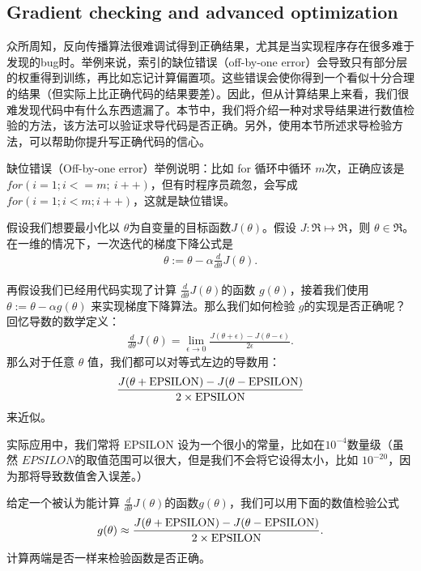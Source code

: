 \subsection{Gradient checking and advanced optimization}
众所周知，反向传播算法很难调试得到正确结果，尤其是当实现程序存在很多难于发现的bug时。举例来说，索引的缺位错误（off-by-one error）会导致只有部分层的权重得到训练，再比如忘记计算偏置项。这些错误会使你得到一个看似十分合理的结果（但实际上比正确代码的结果要差）。因此，但从计算结果上来看，我们很难发现代码中有什么东西遗漏了。本节中，我们将介绍一种对求导结果进行数值检验的方法，该方法可以验证求导代码是否正确。另外，使用本节所述求导检验方法，可以帮助你提升写正确代码的信心。

缺位错误（Off-by-one error）举例说明：比如  for 循环中循环 $ m$次，正确应该是  $for (i=1;i<=m;~i++)$，但有时程序员疏忽，会写成  $for (i=1;i<m;i++)$，这就是缺位错误。

假设我们想要最小化以 $ \theta $为自变量的目标函数$ J(\theta)$。假设 $ J : \Re \mapsto \Re$，则 $ \theta \in \Re$。在一维的情况下，一次迭代的梯度下降公式是
\begin{align}
\theta := \theta - \alpha \frac{d}{d\theta}J(\theta).
\nonumber \end{align}

再假设我们已经用代码实现了计算 $ \frac{d}{d\theta}J(\theta) $的函数 $ g(\theta)$，接着我们使用  $ \theta := \theta - \alpha g(\theta)$ 来实现梯度下降算法。那么我们如何检验 $ g $的实现是否正确呢？
回忆导数的数学定义：
\begin{align}
\frac{d}{d\theta}J(\theta) = \lim_{\epsilon \rightarrow 0}
\frac{J(\theta+ \epsilon) - J(\theta-\epsilon)}{2 \epsilon}.
\nonumber \end{align}
那么对于任意 $ \theta$ 值，我们都可以对等式左边的导数用：
\begin{align}
\frac{J(\theta+{\rm EPSILON}) - J(\theta-{\rm EPSILON})}{2 \times {\rm EPSILON}}
\nonumber \end{align}
来近似。

实际应用中，我们常将 EPSILON 设为一个很小的常量，比如在$ 10^{-4} $数量级（虽然 $ EPSILON $的取值范围可以很大，但是我们不会将它设得太小，比如 $ 10^{-20}$，因为那将导致数值舍入误差。）

给定一个被认为能计算 $ \frac{d}{d\theta}J(\theta) $的函数$ g(\theta)$，我们可以用下面的数值检验公式
\begin{align}
g(\theta) \approx
\frac{J(\theta+{\rm EPSILON}) - J(\theta-{\rm EPSILON})}{2 \times {\rm EPSILON}}.
\nonumber \end{align}
计算两端是否一样来检验函数是否正确。

